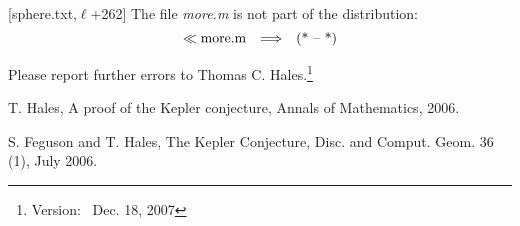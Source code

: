 \documentclass[11pt]{amsart}
\def\ver{~Dec. 18, 2007}
\def\op#1{{\text{#1}}}
\def\to{{\quad\Longrightarrow\quad}}
\def\line{$\ell$}
\def\text{\hbox}
\begin{document}
[sphere.txt,\line+262]
The file {\it more.m} is not part of the distribution:
	$$\ll \op{more.m} \to \op{(* -- *)}$$



Please report further errors to
Thomas C. Hales.\footnote{Version: \ver}


\begin{thebibliography}{}

 {T. Hales}, A proof of the Kepler
	conjecture, Annals of Mathematics,
	2006.
	
 {S. Feguson and T. Hales},
	The Kepler Conjecture, Disc. and Comput.
	Geom. 36 (1), July 2006.


\end{thebibliography}
\end{document}
